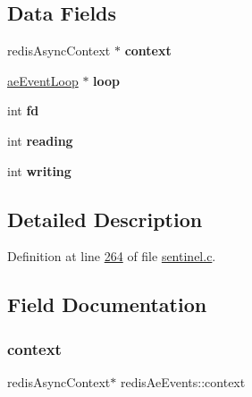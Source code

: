 \subsection*{Data Fields}
\begin{DoxyCompactItemize}
\item 
\mbox{\label{structredisAeEvents_a8ccdd28fe44a7c4e376a8c8f7cbc0954}} 
redis\+Async\+Context $\ast$ {\bfseries context}
\item 
\mbox{\label{structredisAeEvents_abbbedca4a9f5df8e17b39e4bdea83773}} 
\hyperlink{structaeEventLoop}{ae\+Event\+Loop} $\ast$ {\bfseries loop}
\item 
\mbox{\label{structredisAeEvents_a0223bf4ebfbf5d32886e06147ea30df1}} 
int {\bfseries fd}
\item 
\mbox{\label{structredisAeEvents_abf97765c389403e1c0ee36ac60cd38a5}} 
int {\bfseries reading}
\item 
\mbox{\label{structredisAeEvents_aef1285c4c876d3c7f4616830d5fc9d3e}} 
int {\bfseries writing}
\end{DoxyCompactItemize}


\subsection{Detailed Description}


Definition at line \hyperlink{sentinel_8c_source_l00264}{264} of file \hyperlink{sentinel_8c_source}{sentinel.\+c}.



\subsection{Field Documentation}
\mbox{\label{structredisAeEvents_a8ccdd28fe44a7c4e376a8c8f7cbc0954}} 
\subsubsection{\texorpdfstring{context}{context}}
{\footnotesize\ttfamily redis\+Async\+Context$\ast$ redis\+Ae\+Events\+::context}



